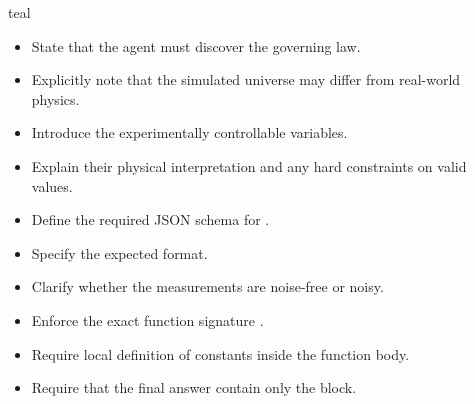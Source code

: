 \begin{promptbox}{teal}
\small
{}
\begin{itemize}
    \item State that the agent must discover the governing law.
    \item Explicitly note that the simulated universe may differ from real-world physics.
\end{itemize}

\begin{itemize}
    \item Introduce the experimentally controllable variables.
    \item Explain their physical interpretation and any hard constraints on valid values.
\end{itemize}

\begin{itemize}
    \item Define the required JSON schema for .
    \item Specify the expected  format.
    \item Clarify whether the measurements are noise-free or noisy.
\end{itemize}

\begin{itemize}
    \item Enforce the exact function signature .
    \item Require local definition of constants inside the function body.
    \item Require that the final answer contain only the  block.
\end{itemize}
\end{promptbox}

